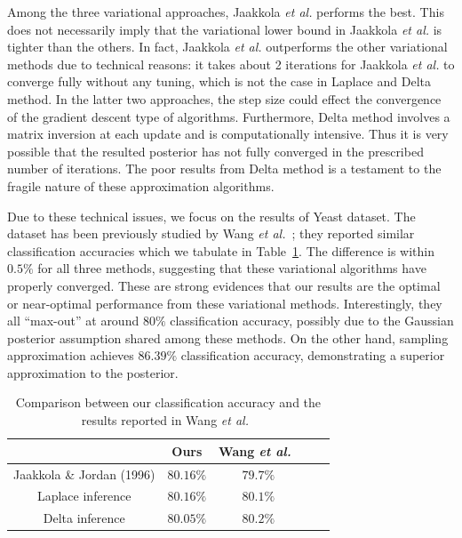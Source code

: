 Among the three variational approaches, Jaakkola {\it et al.} performs the
best. This does not necessarily imply that the variational lower bound in
Jaakkola {\it et al.} is tighter than the others. In fact, Jaakkola {\it et
al.} outperforms the other variational methods due to technical reasons: it
takes about 2 iterations for Jaakkola {\it et al.} to converge fully without
any tuning, which is not the case in Laplace and Delta method. In the latter
two approaches, the step size could effect the convergence of the gradient
descent type of algorithms. Furthermore, Delta method involves a matrix
inversion at each update and is computationally intensive. Thus it is very
possible that the resulted posterior has not fully converged in the prescribed
number of iterations. The poor results from Delta method is a testament to the
fragile nature of these approximation algorithms.

Due to these technical issues, we focus on the results of Yeast dataset. The
dataset has been previously studied by Wang {\it et al.}~\cite{Wang13}; they
reported similar classification accuracies which we tabulate in
Table~\ref{tab:compare_wang}. The difference is within $0.5\%$ for all three
methods, suggesting that these variational algorithms have properly converged.
These are strong evidences that our results are the optimal or near-optimal
performance from these variational methods. Interestingly, they all
``max-out'' at around $80\%$ classification accuracy, possibly due to the
Gaussian posterior assumption shared among these methods. On the other hand,
sampling approximation achieves $86.39\%$ classification accuracy,
demonstrating a superior approximation to the posterior.


\begin{table}
\label{tab:compare_wang}
\begin{center}
\begin{tabular}{| c | c |  c | c | c |}
  \hline
   & Ours  & Wang {\it et al.}~\cite{Wang13} \\
  \hline
  Jaakkola \& Jordan (1996) & $80.16\%$ & $79.7\%$ \\
  \hline
  Laplace inference & $80.16\%$ & $80.1\%$ \\
  \hline
  Delta inference & $80.05\%$ & $80.2\%$ \\
  \hline
\end{tabular}
\end{center}

\caption{Comparison between our classification accuracy and the results
reported in Wang {\it et al.}~\cite{Wang13}}
\end{table}

